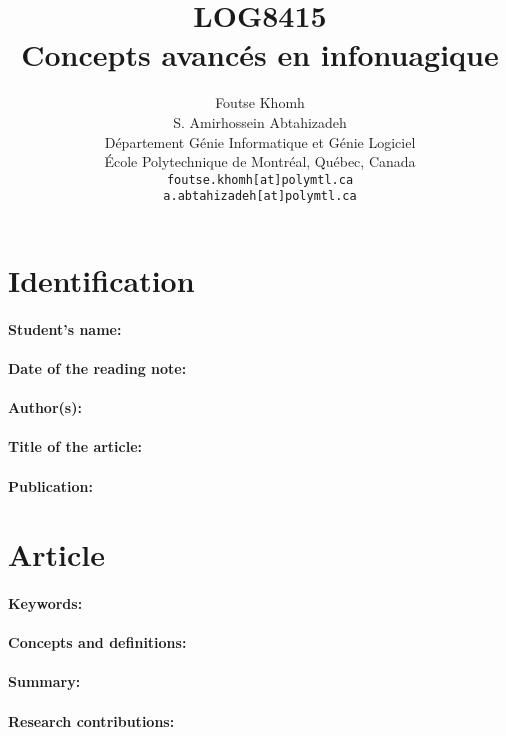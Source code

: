 \documentclass[11pt]{article}
\title{LOG8415\\Concepts avanc\'{e}s en infonuagique}
\author{
    Foutse Khomh \\
    S. Amirhossein Abtahizadeh \\
    D\'{e}partement G\'{e}nie Informatique et G\'{e}nie Logiciel \\
    \'{E}cole Polytechnique de Montr\'{e}al, Qu\'{e}bec, Canada \\
    \texttt{foutse.khomh[at]polymtl.ca} \\
    \texttt{a.abtahizadeh[at]polymtl.ca}
}
\date{}
\def\titre{}
\def\auteur{}
\begin{document}
\maketitle

\section{Identification}

\paragraph{Student's name:} \auteur

\paragraph{Date of the reading note:}

\paragraph{Author(s):}

\paragraph{Title of the article:} \titre

\paragraph{Publication:}

\section{Article}

\paragraph{Keywords:}

\paragraph{Concepts and definitions:}

\paragraph{Summary:}

\paragraph{Research contributions:}
\end{document}
